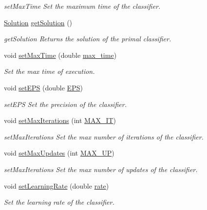\begin{DoxyCompactItemize}
\begin{DoxyCompactList}\small\item\em set\+Max\+Time Set the maximum time of the classifier. \end{DoxyCompactList}\item 
\hyperlink{class_solution}{Solution} \hyperlink{class_classifier_afd2b54ada10af9f4be1c4d326b180dc7}{get\+Solution} ()
\begin{DoxyCompactList}\small\item\em get\+Solution Returns the solution of the primal classifier. \end{DoxyCompactList}\item 
void \hyperlink{class_classifier_a5da324a0de94b7171484f3b1f1f22fbd}{set\+Max\+Time} (double \hyperlink{class_classifier_a191089f044af0f4dd51f37aaff78d8f6}{max\+\_\+time})
\begin{DoxyCompactList}\small\item\em Set the max time of execution. \end{DoxyCompactList}\item 
void \hyperlink{class_classifier_a9cc5a1d92243f9d9b530347be1ac7367}{set\+E\+PS} (double \hyperlink{class_classifier_ad7cd0cfea68461340df2adb0c132dc93}{E\+PS})
\begin{DoxyCompactList}\small\item\em set\+E\+PS Set the precision of the classifier. \end{DoxyCompactList}\item 
void \hyperlink{class_classifier_a58540f77a22c0f1774d0089fac713498}{set\+Max\+Iterations} (int \hyperlink{class_classifier_a9cab88ab4489d771256bffb1717c1644}{M\+A\+X\+\_\+\+IT})
\begin{DoxyCompactList}\small\item\em set\+Max\+Iterations Set the max number of iterations of the classifier. \end{DoxyCompactList}\item 
void \hyperlink{class_classifier_ad8930d5e6002299bdb840d4542229f02}{set\+Max\+Updates} (int \hyperlink{class_classifier_abb8b95854801151e78a1d9f6a2173c22}{M\+A\+X\+\_\+\+UP})
\begin{DoxyCompactList}\small\item\em set\+Max\+Iterations Set the max number of updates of the classifier. \end{DoxyCompactList}\item 
void \hyperlink{class_classifier_a8f6818bd403afbb46d1bfd75c9731ab6}{set\+Learning\+Rate} (double \hyperlink{class_classifier_af9867e5919742de1303dd971a9a1c19a}{rate})
\begin{DoxyCompactList}\small\item\em Set the learning rate of the classifier. \end{DoxyCompactList}\end{DoxyCompactItemize}
